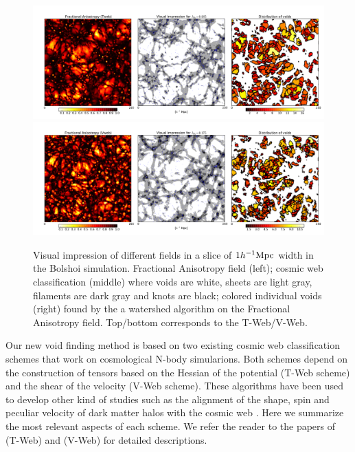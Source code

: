 \documentclass[a4,useAMS,usenatbib,usegraphicx]{mn2e}
\newcommand{\hMpc}{{\ifmmode{h^{-1}{\rm Mpc}}\else{$h^{-1}$Mpc}\fi}}
\begin{document}
\begin{figure}
  \includegraphics[trim = 16mm 8mm 5mm 12mm, clip, keepaspectratio=true,
  width=0.73\textheight]{cosmicweb_FA_Tweb.pdf}
  \includegraphics[trim = 16mm 8mm 5mm 12mm, clip, keepaspectratio=true,
  width=0.73\textheight]{cosmicweb_FA_Vweb.pdf}
  \caption{Visual impression of different fields in a slice of
    $1\hMpc$ width in the Bolshoi simulation.   
    Fractional Anisotropy field (left); cosmic web classification
    (middle) where voids are white, sheets are light gray, filaments
    are dark gray and knots are black; colored individual
    voids (right) found by the a watershed algorithm on the Fractional
    Anisotropy field. Top/bottom corresponds to the T-Web/V-Web.}
  \label{fig:FA_field}
\end{figure}

Our new void finding method is based on two existing cosmic web
classification schemes that work on cosmological N-body simularions.
Both schemes depend on the construction of tensors based on the
Hessian of the potential (T-Web scheme) and the shear of the velocity
(V-Web scheme). 
These algorithms have been used to develop other
kind of studies such as the alignment of the shape, spin and peculiar
velocity of dark matter halos with the cosmic web
\citep{Libeskind13,Forero2014}. 
Here we summarize the most relevant aspects of each scheme. 
We refer the reader to the papers of \cite{Forero09} (T-Web) and
\cite{Hoffman12} (V-Web) for detailed descriptions.  
\end{document}
